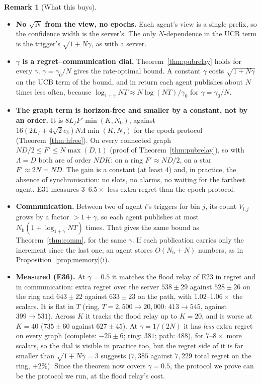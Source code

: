 \documentclass[11pt]{article}
\theoremstyle{definition}
\newtheorem{remark}{Remark}
\newcommand{\Nb}{N_{\mathrm b}}
\begin{document}
\begin{remark}[What this buys]
\begin{itemize}[nosep]
\item \textbf{No $\sqrt N$ from the view, no epochs.} Each agent's view is a single prefix, so the confidence width
is the server's. The only $N$-dependence in the UCB term is the trigger's $\sqrt{1+N\gamma}$, as with a server.
\item \textbf{$\gamma$ is a regret--communication dial.} Theorem~\ref{thm:pubrelay} holds for every $\gamma$.
$\gamma=\gamma_0/N$ gives the rate-optimal bound. A constant $\gamma$ costs $\sqrt{1+N\gamma}$ on the UCB term of the
bound, and in return each agent publishes about $N$ times less often, because $\log_{1+\gamma}NT\approx N\log(NT)/\gamma_0$
for $\gamma=\gamma_0/N$.
\item \textbf{The graph term is horizon-free and smaller by a constant, not by an order.} It is $8L_fF'\min(K,\Nb)$,
against $16(2L_f+4\sqrt2c_\delta)N\Lambda\min(K,\Nb)$ for the epoch protocol (Theorem~\ref{thm:hfree}). On every
connected graph $ND/2\le F'\le N\max(D,1)$ (proof of Theorem~\ref{thm:pubrelay}), so with $\Lambda=D$ both are of
order $NDK$: on a ring $F'\approx ND/2$, on a star $F'\approx2N=ND$. The gain is a constant (at least $4$) and, in
practice, the absence of synchronisation: no slots, no alarms, no waiting for the farthest agent. E31 measures
$3$--$6.5\times$ less extra regret than the epoch protocol.
\item \textbf{Communication.} Between two of agent $l$'s triggers for bin $j$, its count $V_{l,j}$ grows by a factor $>1+\gamma$,
so each agent publishes at most $\Nb(1+\log_{1+\gamma}NT)$ times. That gives the same bound as Theorem~\ref{thm:comm},
for the same $\gamma$. If each publication carries only the increment since the last one, an agent stores $O(\Nb+N)$
numbers, as in Proposition~\ref{prop:memory}(i).
\item \textbf{Measured (E36).} At $\gamma=0.5$ it matches the flood relay of E23 in regret and in communication:
extra regret over the server $538\pm29$ against $528\pm26$ on the ring and $643\pm22$ against $633\pm23$ on the path, with
$1.02$--$1.06\times$ the scalars. It is flat in $T$ (ring, $T=2{,}500\to20{,}000$: $413\to545$, against $399\to531$).
Across $K$ it tracks the flood relay up to $K=20$, and is worse at $K=40$ ($735\pm60$ against $627\pm45$). At
$\gamma=1/(2N)$ it has \emph{less} extra regret on every graph (complete: $-25\pm6$; ring: $381$; path: $488$), for
$7$--$8\times$ more scalars, so the dial is visible in practice too, but the regret side of it is far smaller than
$\sqrt{1+N\gamma}=3$ suggests ($7{,}385$ against $7{,}229$ total regret on the ring, $+2\%$). Since the theorem now covers
$\gamma=0.5$, the protocol we prove can be the protocol we run, at the flood relay's cost.
\end{itemize}
\end{remark}
\end{document}
